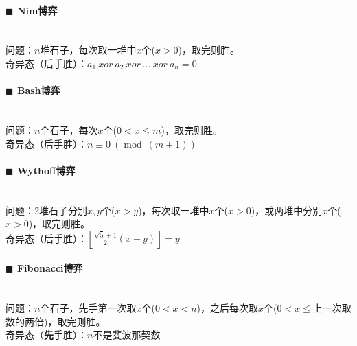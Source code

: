 \paragraph{$\blacksquare$ Nim博弈\\}
\noindent \\
问题：$n$堆石子，每次取一堆中$x$个($x>0$)，取完则胜。\\
奇异态（后手胜）：$a_1~xor~a_2~xor~...~xor~a_n=0$
\paragraph{$\blacksquare$ Bash博弈\\}
\noindent \\
问题：$n$个石子，每次$x$个($0<x\leq m$)，取完则胜。\\
奇异态（后手胜）：$n\equiv 0~(\operatorname{mod}~(m+1))$
\paragraph{$\blacksquare$ Wythoff博弈\\}
\noindent \\
问题：2堆石子分别$x, y$个($x>y$)，每次取一堆中$x$个($x>0$)，或两堆中分别$x$个($x>0$)，取完则胜。\\
奇异态（后手胜）：$\left \lfloor \frac{\sqrt{5}+1}{2} (x-y) \right \rfloor =y$
\paragraph{$\blacksquare$ Fibonacci博弈\\}
\noindent \\
问题：$n$个石子，先手第一次取$x$个($0<x<n$)，之后每次取$x$个($0<x\leq$上一次取数的两倍)，取完则胜。\\
奇异态（\textbf{先}手胜）：$n$不是斐波那契数
